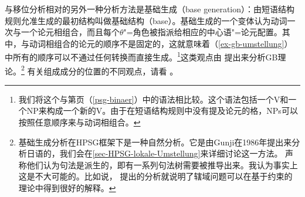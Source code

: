 与移位分析相对的另外一种分析方法是基础生成（base generation）：由短语结构规则允准生成的最初结构叫做基础结构（base）。基础生成的一个变体认为动词一次与一个论元相组合，而且每个$\theta$"=角色被指派给相应的中心语"=论元配置。其中，与动词相组合的论元的顺序不是固定的，这就意味着（\ref{ex-gb-umstellung}）中所有的顺序可以不通过任何转换而直接生成。\footnote{%
我们将这个与第\pageref{psg-binaer}页（\ref{psg-binaer}）中的语法相比较。这个语法包括一个V和一个NP来构成一个新的V。由于在短语结构规则中没有提及论元的格，NPs可以按照任意顺序来与动词相组合。
}这类观点由 \citet{Fanselow2001a}提出来分析GB理论。\footnote{%
基础生成分析在HPSG\indexhpsgc 框架下是一种自然分析。它是由Gunji\nocite{Gunji86a}在1986年提出来分析日语的，我们会在\ref{sec-HPSG-lokale-Umstellung}来详细讨论这一方法。 \citet[--314]{SE2002a}声称他们认为句法是派生的，即有一系列句法树需要被推导出来。我认为事实上这是不大可能的。比如说， \citet{Kiss2001a}提出的分析就说明了辖域问题可以在基于约束的理论中得到很好的解释。
}
有关组成成分的位置的不同观点，请看 。


